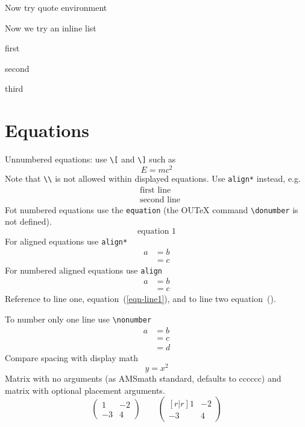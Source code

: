 \documentclass[solutionsatend,twocolumnsolutions]{ouunit}
\begin{document}
Now try quote environment
\begin{quote}
\lipsum[133]
\end{quote}

Now we try an inline list
\begin{enumerate*}
\item first 
\item second
\item third
\end{enumerate*}
\section{Equations}
Unnumbered equations: use \verb”\[” and \verb”\]” such as
\[
E=mc^2
\]
Note that \verb”\\” is not allowed within displayed equations. Use \verb"align*" instead, e.g.
\begin{align*}
&\text{first line}\\
&\text{second line}
\end{align*}
Fot numbered equations use the \verb”equation” (the OUTeX command \verb”\donumber” is not defined).
\begin{equation}
\text{equation }1
\end{equation}
For aligned equations use \verb”align*”
\begin{align*}
a& =b\\
&=c
\end{align*}
For numbered aligned equations use \verb”align”
\begin{align}
a& =b\label{eqn-line1}\\
&=c\label{eqn-line2}
\end{align}
Reference to line one, equation~(\ref{eqn-line1}), and to line two equation~().

To number only one line use \verb”\nonumber”
\begin{align}
a& =b\nonumber\\
&=c\label{eqn-middle-line}\\
&=d\nonumber
\end{align}
Compare spacing with display math
\[
y=x^2
\]
Matrix with no arguments (as AMSmath standard, defaults to cccccc) and matrix with optional placement arguments.
\[
\begin{pmatrix}
1 & -2\\
-3 & 4
\end{pmatrix}
\qquad
\begin{pmatrix}[r|r]
1 & -2\\
-3 & 4
\end{pmatrix}
\]
\end{document}
